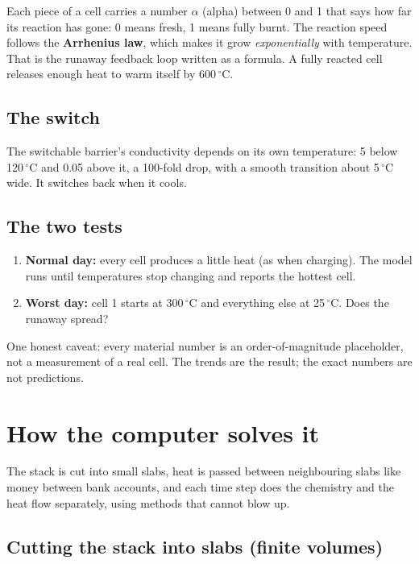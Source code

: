 \documentclass[11pt]{article}
\begin{document}
Each piece of a cell carries a number $\alpha$ (alpha) between 0 and 1 that says how far
its reaction has gone: 0 means fresh, 1 means fully burnt. The reaction speed follows the
\textbf{Arrhenius law}, which makes it grow \emph{exponentially} with temperature. That
is the runaway feedback loop written as a formula. A fully reacted cell releases enough
heat to warm itself by 600\,$^\circ$C.

\subsection*{The switch}

The switchable barrier's conductivity depends on its own temperature: 5 below 120\,$^\circ$C
and 0.05 above it, a 100-fold drop, with a smooth transition about 5\,$^\circ$C wide. It
switches back when it cools.

\subsection*{The two tests}

\begin{enumerate}
  \item \textbf{Normal day:} every cell produces a little heat (as when charging). The
        model runs until temperatures stop changing and reports the hottest cell.
  \item \textbf{Worst day:} cell 1 starts at 300\,$^\circ$C and everything else at
        25\,$^\circ$C. Does the runaway spread?
\end{enumerate}

\noindent One honest caveat: every material number is an order-of-magnitude placeholder,
not a measurement of a real cell. The trends are the result; the exact numbers are not
predictions.

\section{How the computer solves it}

\begin{idea}
The stack is cut into small slabs, heat is passed between neighbouring slabs like money
between bank accounts, and each time step does the chemistry and the heat flow
separately, using methods that cannot blow up.
\end{idea}

\subsection*{Cutting the stack into slabs (finite volumes)}
\end{document}
